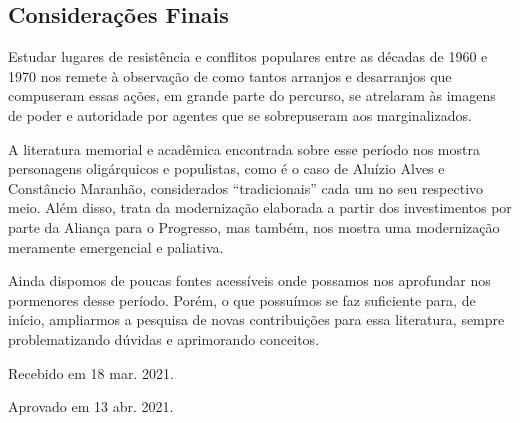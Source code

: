 \begin{refsection}
    \section{Considerações Finais}

    Estudar lugares de resistência e conflitos populares entre as décadas de 1960 e 1970 nos remete à observação de como tantos arranjos e desarranjos que compuseram essas ações, em grande parte do percurso, se atrelaram às imagens de poder e autoridade por agentes que se sobrepuseram aos marginalizados. 

    A literatura memorial e acadêmica encontrada sobre esse período nos mostra personagens oligárquicos e populistas, como é o caso de Aluízio Alves e Constâncio Maranhão, considerados ``tradicionais'' cada um no seu respectivo meio. Além disso, trata da modernização elaborada a partir dos investimentos por parte da Aliança para o Progresso, mas também, nos mostra uma modernização meramente emergencial e paliativa.

    Ainda dispomos de poucas fontes acessíveis onde possamos nos aprofundar nos pormenores desse período. Porém, o que possuímos se faz suficiente para, de início, ampliarmos a pesquisa de novas contribuições para essa literatura, sempre problematizando dúvidas e aprimorando conceitos.

    \nocite{TroubledLand1961}
    \nocite{RelatorioDNOC1976}
    \nocite{Pereira2007Estados}

    \printbibliography[heading=subbibliography,notcategory=fullcited]

    \hfill Recebido em 18 mar. 2021.

    \hfill Aprovado em 13 abr. 2021.

    \label{chap:frentestrabend}

\end{refsection}
